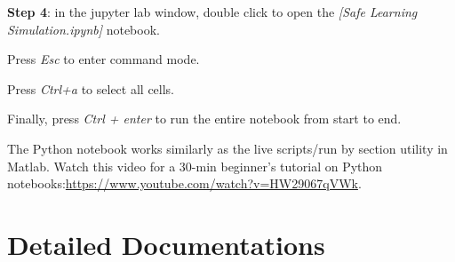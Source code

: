 \documentclass{article}
\theoremstyle{definition}
\theoremstyle{remark}
\begin{document}
	\textbf{Step 4}: in the jupyter lab window, double click to open the \textit{[Safe Learning Simulation.ipynb]} notebook. 
	
	Press \textit{Esc} to enter command mode. 
	
	Press \textit{Ctrl+a} to select all cells.
	
	Finally, press \textit{Ctrl + enter} to run the entire notebook from start to end.
	
	The Python notebook works similarly as the live scripts/run by section utility in Matlab. Watch this video for a 30-min beginner's tutorial on Python notebooks:\url{https://www.youtube.com/watch?v=HW29067qVWk}.
	
	\section{Detailed Documentations}\label{sec:details}
	
	
	
\end{document}
